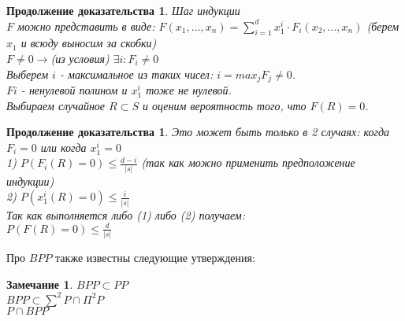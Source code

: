 \documentclass{beamer}
\theoremstyle{plain}
\newtheorem{rmk}[thm]{Замечание}
\newtheorem{proof-rus-cont}[thm]{Продолжение доказательства}
\theoremstyle{definition}
\begin{document}
\begin{frame}
    \begin{proof-rus-cont}
        Шаг индукции\\
        $F$ можно представить в виде:
        $F(x_1, ... , x_n) = \sum_{i=1}^d x_1^i \cdot F_i(x_2, ... , x_n)$ (берем $x_1$ и всюду выносим за скобки) \\
        $F \neq 0 \rightarrow$(из условия) $\exists i: F_i \neq 0$\\
        Выберем $i$ - максимальное из таких чисел: $i = max_{j} F_j \neq 0$.\\
        $Fi$ - ненулевой полином и $x_1^i$ тоже не нулевой. \\
        Выбираем случайное $R \subset S$ и оценим вероятность того, что $F(R) = 0$.
        
    \end{proof-rus-cont}
\end{frame}

\begin{frame}
    \begin{proof-rus-cont}
        Это может быть только в 2 случаях: когда $F_i = 0$ или когда $x_1^i = 0$\\
        1) $P(F_i(R)=0) \leq \frac{d-i}{|s|}$ (так как можно применить предположение индукции) \\
        2) $P(x_1^i(R) = 0) \leq \frac{i}{|s|}$\\
        Так как выполняется либо (1) либо (2) получаем:\\
        $P(F(R)=0)\leq \frac{d}{|s|}$
    \end{proof-rus-cont}
\end{frame}

\begin{frame}
    Про $BPP$ также известны следующие утверждения:
    \begin{rmk}
        $BPP \subset PP$ \\
        $BPP \subset \sum^2P \cap \Pi^2P$ \\
        $P \cap BPP$
    \end{rmk}
\end{frame}
\end{document}

